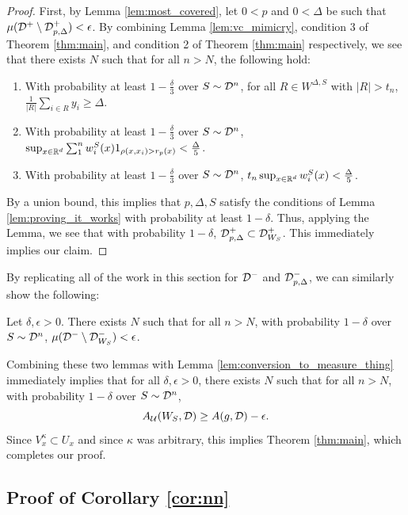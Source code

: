\begin{proof}
First, by Lemma \ref{lem:most_covered}, let $0 < p$ and $0 < \Delta$ be such that $\mu({\mathcal D}^+ \setminus {\mathcal D}_{p, \Delta}^+) < \epsilon$. By combining Lemma \ref{lem:vc_mimicry}, condition 3 of Theorem \ref{thm:main}, and condition 2 of Theorem \ref{thm:main} respectively,  we see that there exists $N$ such that for all $n > N$, the following hold:
\begin{enumerate}
	\item With probability at least $1 - \frac{\delta}{3}$ over $S \sim {\mathcal D}^n$, for all $R \in W^{\Delta, S}$ with $|R| > t_n$, $\frac{1}{|R|} \sum_{i \in R} y_i \geq \Delta$. 
	\item With probability at least $1 - \frac{\delta}{3}$ over $S \sim {\mathcal D}^n$, $\sup_{x \in \mathbb R^d} \sum_1^n w_i^S(x)1_{\rho(x, x_i) > r_p(x)} < \frac{\Delta}{5}$.
	\item With probability at least $1 - \frac{\delta}{3}$ over $S \sim {\mathcal D}^n$, $t_n\sup_{x \in \mathbb R^d} w_i^S(x) < \frac{\Delta}{5}$. 
\end{enumerate}
By a union bound, this implies that $p, \Delta, S$ satisfy the conditions of Lemma \ref{lem:proving_it_works} with probability at least $1 - \delta$.  Thus, applying the Lemma, we see that with probability $1 - \delta$, ${\mathcal D}_{p, \Delta}^+ \subset {\mathcal D}_{W_S}^+$. This immediately implies our claim. 
\end{proof}

By replicating all of the work in this section for ${\mathcal D}^-$ and ${\mathcal D}_{p, \Delta}^-$, we can similarly show the following: 

\begin{lem}
Let $\delta, \epsilon > 0$. There exists $N$ such that for all $n > N$, with probability $1 - \delta$ over $S \sim {\mathcal D}^n$, $\mu({\mathcal D}^- \setminus {\mathcal D}_{W_S}^-) < \epsilon$. 
\end{lem}

Combining these two lemmas with Lemma \ref{lem:conversion_to_measure_thing} immediately implies that for all $\delta, \epsilon > 0$, there exists $N$ such that for all $n > N$, with probability $1- \delta$ over $S \sim {\mathcal D}^n$, $$A_{\mathcal U}(W_S, {\mathcal D}) \geq A(g, {\mathcal D}) - \epsilon.$$ Since $V_x^\kappa \subset U_x$ and since $\kappa$ was arbitrary, this implies Theorem \ref{thm:main}, which completes our proof. 

\subsection{Proof of Corollary \ref{cor:nn}}


